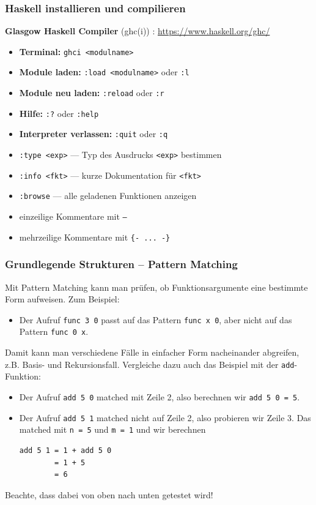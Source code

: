 \documentclass{beamer}
\begin{document}
	\begin{frame}\frametitle{Haskell installieren und compilieren}
		\textbf{Glasgow Haskell Compiler} (ghc(i)) :  \url{https://www.haskell.org/ghc/}
		
		\begin{itemize}
			\item \textbf{Terminal:} \texttt{ghci <modulname>}
			\item \textbf{Module laden: } \texttt{:load <modulname>} oder \texttt{:l}
			\item \textbf{Module neu laden: } \texttt{:reload} oder \texttt{:r}
			\item \textbf{Hilfe: } \texttt{:?} oder \texttt{:help}
			\item \textbf{Interpreter verlassen: } \texttt{:quit} oder \texttt{:q}
			
			\bigskip
			
	 		\item \texttt{:type <exp>} --- Typ des Ausdrucks \texttt{<exp>} bestimmen
			\item \texttt{:info <fkt>} --- kurze Dokumentation für \texttt{<fkt>}
			\item \texttt{:browse} --- alle geladenen Funktionen anzeigen
			
			\bigskip
			
			\item einzeilige Kommentare mit \texttt{--}
			\item mehrzeilige Kommentare mit \texttt{\{- ... -\}}
		\end{itemize}
	\end{frame}
	\begin{frame}[fragile] \frametitle{Grundlegende Strukturen -- Pattern Matching}
		\footnotesize
		Mit Pattern Matching kann man prüfen, ob Funktionsargumente eine bestimmte Form aufweisen.
		Zum Beispiel:
		\begin{itemize}
			\item Der Aufruf \texttt{func 3 0} passt auf das Pattern \texttt{func x 0}, aber nicht auf das Pattern \texttt{func 0 x}.
		\end{itemize}
		Damit kann man verschiedene Fälle in einfacher Form nacheinander abgreifen, z.B. Basis- und Rekursionsfall. Vergleiche dazu auch das Beispiel mit der \texttt{add}-Funktion:
		\begin{itemize}
			\item Der Aufruf \texttt{add 5 0} matched mit Zeile 2, also berechnen wir \texttt{add 5 0 = 5}.
			\item Der Aufruf \texttt{add 5 1} matched nicht auf Zeile 2, also probieren wir Zeile 3. Das matched mit \texttt{n = 5} und \texttt{m = 1} und wir berechnen
			\begin{lstlisting}[frame=none, numbers=none]
add 5 1 = 1 + add 5 0
        = 1 + 5
        = 6
			\end{lstlisting}
		\end{itemize}
		Beachte, dass dabei von oben nach unten getestet wird!
	\end{frame}
\end{document}
